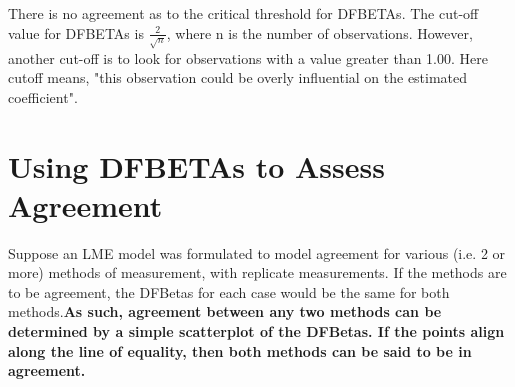 \documentclass[12pt, a4paper]{report}
\theoremstyle{plain}
\theoremstyle{definition}
\theoremstyle{remark}
\begin{document}
There is no agreement as to the critical threshold for DFBETAs. The cut-off value for DFBETAs is $\frac{2}{\sqrt{n}}$, where n is the number of observations. 
However, another cut-off is to look for observations with a value greater than 1.00. Here cutoff means, 
"this observation could be overly influential on the estimated coefficient".

\section*{ Using DFBETAs to Assess Agreement}
Suppose an LME model was formulated to model agreement for various (i.e. 2 or more) methods of measurement, with replicate measurements. If the methods are to be agreement, the DFBetas for each case would be the same for both methods.\textbf{As such, agreement between any two methods can be determined by a simple scatterplot of the DFBetas. If the points align along the line of equality, then both methods can be said to be in agreement.}
\end{document}
